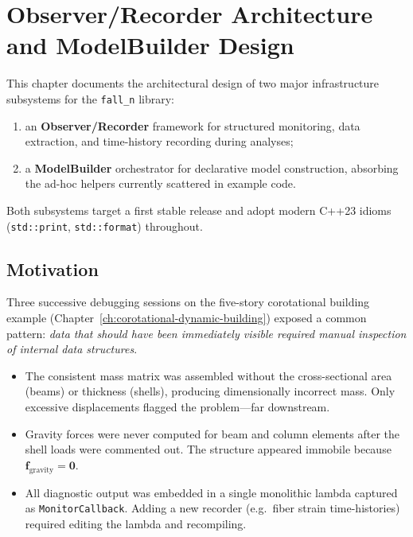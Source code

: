 
\chapter{Observer/Recorder Architecture and ModelBuilder Design}
\label{ch:observer-model-builder-design}

This chapter documents the architectural design of two major
infrastructure subsystems for the \texttt{fall\_n} library:
\begin{enumerate}
  \item an \textbf{Observer/Recorder} framework for structured monitoring,
        data extraction, and time-history recording during analyses;
  \item a \textbf{ModelBuilder} orchestrator for declarative model
        construction, absorbing the ad-hoc helpers currently scattered
        in example code.
\end{enumerate}
Both subsystems target a first stable release and adopt modern C++23
idioms (\texttt{std::print}, \texttt{std::format}) throughout.


\section{Motivation}
\label{sec:obs-motivation}

Three successive debugging sessions on the five-story corotational
building example (Chapter~\ref{ch:corotational-dynamic-building})
exposed a common pattern: \emph{data that should have been immediately
visible required manual inspection of internal data structures}.

\begin{itemize}
  \item The consistent mass matrix was assembled without the
        cross-sectional area (beams) or thickness (shells), producing
        dimensionally incorrect mass.  Only excessive displacements
        flagged the problem---far downstream.
  \item Gravity forces were never computed for beam and column elements
        after the shell loads were commented out.  The structure appeared
        immobile because $\mathbf{f}_{\text{gravity}} = \mathbf{0}$.
  \item All diagnostic output was embedded in a single monolithic lambda
        captured as \texttt{MonitorCallback}.  Adding a new recorder
        (e.g.\ fiber strain time-histories) required editing the lambda
        and recompiling.
\end{itemize}

